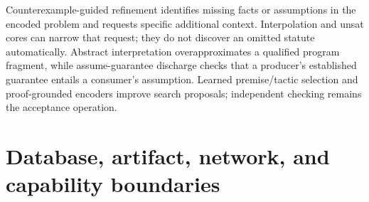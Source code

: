 \documentclass{article}
\begin{document}
Counterexample-guided refinement identifies missing facts or assumptions in the encoded problem and requests specific additional context. Interpolation and unsat cores can narrow that request; they do not discover an omitted statute automatically. Abstract interpretation overapproximates a qualified program fragment, while assume-guarantee discharge checks that a producer's established guarantee entails a consumer's assumption. Learned premise/tactic selection and proof-grounded encoders improve search proposals; independent checking remains the acceptance operation.

\section{Database, artifact, network, and capability boundaries}

\end{document}
